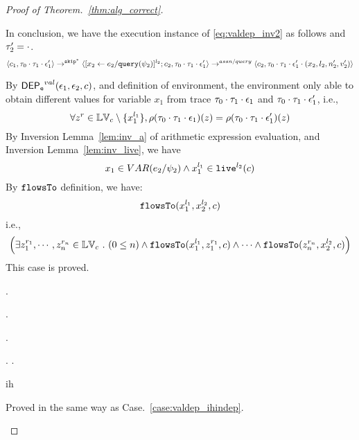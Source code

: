 \begin{proof}[Proof of Theorem.~\ref{thm:alg_correct}]
\begin{case}[$P(\cdot)$]
\begin{subproof}[Subproof]
In conclusion, we have the execution instance of \ref{eq:valdep_inv2}  as follows and $\mathtt{\tau}_2' = \cdot$.
  \[
  \langle c_1, \mathtt{\tau}_0 \cdot \mathtt{\tau}_1 \cdot \mathtt{\epsilon}_1' \rangle 
  \rightarrow^{\mathtt{skip}^*} 
  \langle [\mathrel{ {x}_2 \leftarrow e_2 / {\tt query}(\psi_2) }]^{l_2} ; {c}_2, \mathtt{\tau}_0 \cdot \mathtt{\tau}_1 \cdot \mathtt{\epsilon}_1' \rangle 
  \rightarrow^{assn/query} 
  \langle {c}_2,  \mathtt{\tau}_0 \cdot \mathtt{\tau}_1 \cdot \mathtt{\epsilon}_1' \cdot (x_2, l_2, n_2', v_2') \rangle 
 \]
\end{subproof}
%
By $\mathsf{DEP_{\mathtt{e}}}^{val}(\mathtt{\epsilon}_1, \mathtt{\epsilon}_2, c)$, and definition of environment, 
the environment only able to obtain different values for variable $x_1$ 
from trace $\mathtt{\tau}_0 \cdot \mathtt{\tau}_1 \cdot \mathtt{\epsilon}_1$ and 
$\mathtt{\tau}_0 \cdot \mathtt{\tau}_1 \cdot \mathtt{\epsilon}_1'$, i.e.,
\[
  \forall z^r \in \mathbb{LV}_c \setminus \{x_1^{l_1}\} ,
  \rho(\mathtt{\tau}_0 \cdot \mathtt{\tau}_1 \cdot \mathtt{\epsilon}_1) (z) =  
  \rho(\mathtt{\tau}_0 \cdot \mathtt{\tau}_1 \cdot \mathtt{\epsilon}_1') (z)
\]
%
By {Inversion Lemma~\ref{lem:inv_a}} of arithmetic expression evaluation, and Inversion Lemma~\ref{lem:inv_live}, we have 
\[
  x_1 \in VAR(e_2 / \psi_2) 
  \land x_1^{l_1} \in \mathtt{live}^{l_2}(c)
\]
%
By $\mathtt{flowsTo}$ definition, we have:
%
\[
\mathtt{flowsTo}(x_1^{l_1}, {x}_2^{l_2}, c)
\]
i.e.,
%
\[
\Big(\exists z_1^{r_1}, \cdots, z_n^{r_n} \in \mathbb{LV}_{{c}} ~.~ (0 \leq n )
 \land \mathtt{flowsTo}(x_1^{l_1}, z_1^{r_1}, c) \land \cdots \land \mathtt{flowsTo}(z_n^{r_n}, {x}_2^{l_2}, c) \Big)
 \]
%
This case is proved.
\end{case}
%
\begin{case}
\label{case:valdep_ih}.
\begin{subcase}
\label{case:valdep_ihindep}.
\end{subcase}
\begin{subcase}
\label{case:valdep_ihdep}.
\begin{subsubcase}.
\label{case:valdep_ihdepasn}.
\begin{subsubsubcase}
ih
\end{subsubsubcase}
\begin{subsubsubcase}
Proved in the same way as Case.~\ref{case:valdep_ihindep}.
\end{subsubsubcase}

\end{subsubcase}
\end{subcase}
\end{case}
\end{proof}
